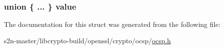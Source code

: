 \subsubsection[{\texorpdfstring{value}{value}}]{\setlength{\rightskip}{0pt plus 5cm}union \{ ... \}   value}\hypertarget{structocsp__responder__id__st_acfecdd4a43f4a1c957f6352d74b4e729}{}\label{structocsp__responder__id__st_acfecdd4a43f4a1c957f6352d74b4e729}


The documentation for this struct was generated from the following file\+:\begin{DoxyCompactItemize}
\item 
s2n-\/master/libcrypto-\/build/openssl/crypto/ocsp/\hyperlink{crypto_2ocsp_2ocsp_8h}{ocsp.\+h}\end{DoxyCompactItemize}
